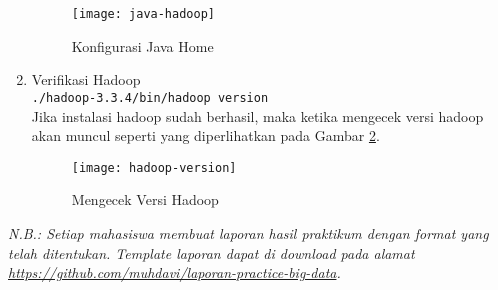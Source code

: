 \documentclass[a4paper]{tufte-handout}
\begin{document}
\begin{enumerate}
\begin{figure}
\texttt{[image: java-hadoop]}
\caption{Konfigurasi Java Home}
\label{gam:java-hadoop}
\end{figure}

\item Verifikasi Hadoop \\
{\tt ./hadoop-3.3.4/bin/hadoop version} \\
Jika instalasi hadoop sudah berhasil, maka ketika mengecek versi hadoop akan muncul seperti yang diperlihatkan pada Gambar \ref{gam:hadoop-version}.

\begin{figure}[!ht]
\texttt{[image: hadoop-version]}
\caption{Mengecek Versi Hadoop}
\label{gam:hadoop-version}
\end{figure}
\end{enumerate}

\hrulefill

\clearpage
{}
\textit{N.B.: Setiap mahasiswa membuat laporan hasil praktikum dengan format yang telah ditentukan. Template laporan dapat di download pada alamat \url{https://github.com/muhdavi/laporan-practice-big-data}.}

 \\
\end{document}
